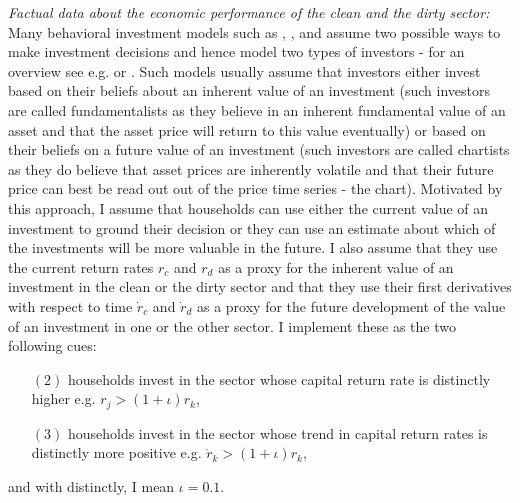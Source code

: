 \textit{Factual data about the economic performance of the clean and the dirty sector:}
Many behavioral investment models such as \cite{Lux1999}, \cite{Alfarano2008a}, \cite{Chiarella2011a} and \cite{Hommes2017BoomsPrices} assume two possible ways to make investment decisions and hence model two types of investors - for an overview see e.g. \cite{Hommes2006a} or \cite{Chakraborti2011}. Such models usually assume that investors either invest based on their beliefs about an inherent value of an investment (such investors are called fundamentalists as they believe in an inherent fundamental value of an asset and that the asset price will return to this value eventually) or based on their beliefs on a future value of an investment (such investors are called chartists as they do believe that asset prices are inherently volatile and that their future price can best be read out out of the price time series - the chart).
Motivated by this approach, I assume that households can use either the current value of an investment to ground their decision or they can use an estimate about which of the investments will be more valuable in the future. I also assume that they use the current return rates $r_c$ and $r_d$ as a proxy for the inherent value of an investment in the clean or the dirty sector and that they use their first derivatives with respect to time $\dot{r}_c$ and $\dot{r}_d$ as a proxy for the future development of the value of an investment in one or the other sector. I implement these as the two following cues:
\begin{itemize}
  \item [$(2)$] households invest in the sector whose capital return rate is distinctly higher e.g. $r_j > (1+\iota) r_k$,
  \item [$(3)$] households invest in the sector whose trend in capital return rates is distinctly more positive e.g. $\dot{r}_k > (1+\iota) r_k$,
\end{itemize}
and with distinctly, I mean $\iota = 0.1$.\\

